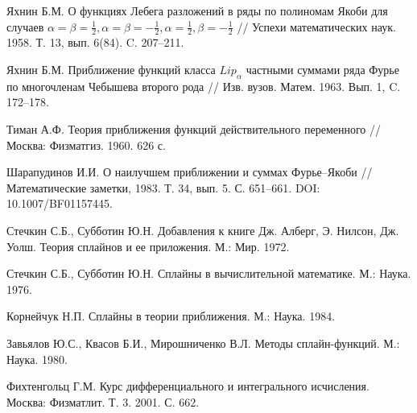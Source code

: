 \begin{thebibliography}{999}

 Яхнин Б.М. О функциях Лебега разложений в ряды по полиномам Якоби для случаев $\alpha=\beta=\frac12, \alpha=\beta=-\frac12, \alpha=\frac12, \beta=-\frac12$ // Успехи математических наук. 1958. Т. 13, вып. 6(84). C. 207--211.




 Яхнин Б.М. Приближение функций класса $Lip_\alpha$ частными суммами ряда Фурье по многочленам Чебышева второго рода // Изв. вузов. Матем. 1963. Вып. 1, C. 172--178.




 Тиман А.Ф. Теория приближения функций действительного переменного // Москва: Физматгиз. 1960. 626 с.




 Шарапудинов И.И. О наилучшем приближении и суммах Фурье–Якоби // Математические заметки, 1983. Т. 34, вып. 5. С. 651--661. DOI: 10.1007/BF01157445.




  Стечкин С.Б., Субботин Ю.Н. Добавления к книге Дж. Алберг, Э. Нилсон, Дж. Уолш.
 Теория сплайнов и ее приложения.  М.: Мир. 1972.




 Стечкин С.Б., Субботин Ю.Н.  Сплайны в вычислительной математике. М.:  Наука. 1976.




Корнейчук Н.П.  Сплайны в теории приближения. М.:  Наука. 1984.





Завьялов Ю.С., Квасов Б.И., Мирошниченко В.Л.  Методы сплайн-функций.  М.: Наука. 1980.





Фихтенгольц Г.М. Курс дифференциального и интегрального исчисления. Москва: Физматлит. Т. 3. 2001. С. 662.

\end{thebibliography}
